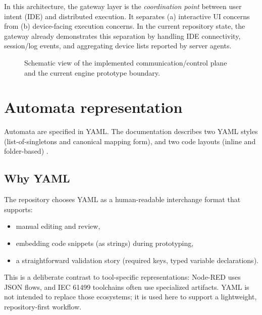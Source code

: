 In this architecture, the gateway layer is the \emph{coordination point} between user intent (IDE) and distributed execution.
It separates (a) interactive UI concerns from (b) device-facing execution concerns.
In the current repository state, the gateway already demonstrates this separation by handling IDE connectivity, session/log events, and aggregating device lists reported by server agents.

\begin{figure}[h]
\centering
{}
\caption{Schematic view of the implemented communication/control plane and the current engine prototype boundary.}
\end{figure}

\section{Automata representation}

Automata are specified in YAML.
The documentation describes two YAML styles (list-of-singletons and canonical mapping form), and two code layouts (inline and folder-based) \cite{AetheriumYAMLSpec}.

\subsection{Why YAML}

The repository chooses YAML as a human-readable interchange format that supports:
\begin{itemize}
  \item manual editing and review,
  \item embedding code snippets (as strings) during prototyping,
  \item a straightforward validation story (required keys, typed variable declarations).
\end{itemize}

This is a deliberate contrast to tool-specific representations: Node-RED uses JSON flows, and IEC 61499 toolchains often use specialized artifacts.
YAML is not intended to replace those ecosystems; it is used here to support a lightweight, repository-first workflow.

